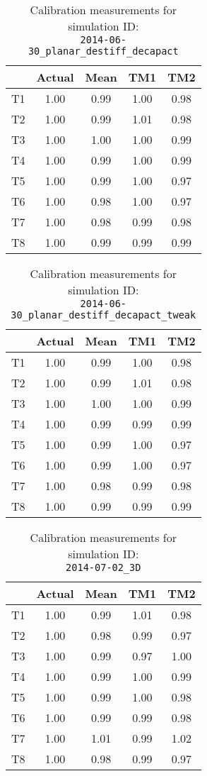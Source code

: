 \begin{table}[H]
\centering
\cprotect\caption{Calibration measurements for simulation ID:\\
\verb|2014-06-30_planar_destiff_decapact|}
\begin{tabular}{|c|c|c|c|c|} \hline
~ & Actual & Mean & TM1 & TM2 \\ \hline
T1 & 1.00 & 0.99 & 1.00 & 0.98 \\
T2 & 1.00 & 0.99 & 1.01 & 0.98 \\
T3 & 1.00 & 1.00 & 1.00 & 0.99 \\
T4 & 1.00 & 0.99 & 1.00 & 0.99 \\
T5 & 1.00 & 0.99 & 1.00 & 0.97 \\
T6 & 1.00 & 0.98 & 1.00 & 0.97 \\
T7 & 1.00 & 0.98 & 0.99 & 0.98 \\
T8 & 1.00 & 0.99 & 0.99 & 0.99 \\ \hline
\end{tabular}
\label{calib-3}
\end{table}

\begin{table}[H]
\centering
\cprotect\caption{Calibration measurements for simulation ID:\\
\verb|2014-06-30_planar_destiff_decapact_tweak|}
\begin{tabular}{|c|c|c|c|c|} \hline
~ & Actual & Mean & TM1 & TM2 \\ \hline
T1 & 1.00 & 0.99 & 1.00 & 0.98 \\
T2 & 1.00 & 0.99 & 1.01 & 0.98 \\
T3 & 1.00 & 1.00 & 1.00 & 0.99 \\
T4 & 1.00 & 0.99 & 0.99 & 0.99 \\
T5 & 1.00 & 0.99 & 1.00 & 0.97 \\
T6 & 1.00 & 0.99 & 1.00 & 0.97 \\
T7 & 1.00 & 0.98 & 0.99 & 0.98 \\
T8 & 1.00 & 0.99 & 0.99 & 0.99 \\ \hline
\end{tabular}
\label{calib-4}
\end{table}

\begin{table}[H]
\centering
\cprotect\caption{Calibration measurements for simulation ID:\\
\verb|2014-07-02_3D|}
\begin{tabular}{|c|c|c|c|c|} \hline
~ & Actual & Mean & TM1 & TM2 \\ \hline
T1 & 1.00 & 0.99 & 1.01 & 0.98 \\
T2 & 1.00 & 0.98 & 0.99 & 0.97 \\
T3 & 1.00 & 0.99 & 0.97 & 1.00 \\
T4 & 1.00 & 0.99 & 1.00 & 0.99 \\
T5 & 1.00 & 0.99 & 1.00 & 0.98 \\
T6 & 1.00 & 0.99 & 0.99 & 0.98 \\
T7 & 1.00 & 1.01 & 0.99 & 1.02 \\
T8 & 1.00 & 0.98 & 0.99 & 0.97 \\ \hline
\end{tabular}
\label{calib-5}
\end{table}

